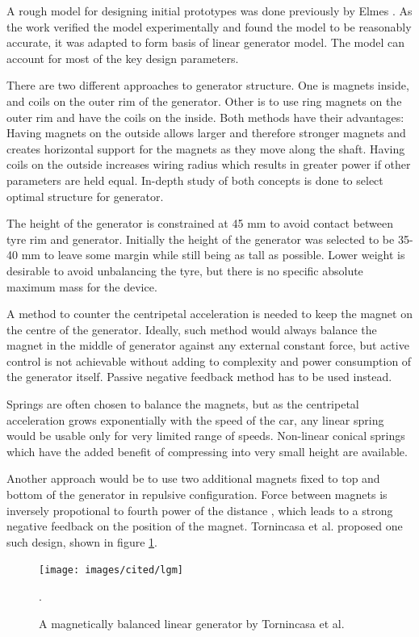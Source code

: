 A rough model for designing initial prototypes was done previously by Elmes \cite{Elmes2005}. As the work verified the model experimentally and found the model to be reasonably accurate, it was adapted to form basis of linear generator model. The model can account for most of the key design parameters. 

There are two different approaches to generator structure. One is magnets inside, and coils on the outer rim of the generator. Other is to use ring magnets on the outer rim and have the coils on the inside. Both methods have their advantages: Having magnets on the outside allows larger and therefore stronger magnets and creates horizontal support for the magnets as they move along the shaft. Having coils on the outside increases wiring radius which results in greater power if other parameters are held equal. In-depth study of both concepts is done to select optimal structure for generator. 

The height of the generator is constrained at 45 mm to avoid contact between tyre rim and generator. Initially the height of the generator was selected to be 35-40 mm to leave some margin while still being as tall as possible. Lower weight is desirable to avoid unbalancing the tyre, but there is no specific absolute maximum mass for the device. 

A method to counter the centripetal acceleration is needed to keep the magnet on the centre of the generator. Ideally, such method would always balance the magnet in the middle of generator against any external constant force, but active control is not achievable without adding to complexity and power consumption of the generator itself. Passive negative feedback method has to be used instead. 

Springs are often chosen to balance the magnets, but as the centripetal acceleration grows exponentially with the speed of the car, any linear spring would be usable only for very limited range of speeds. Non-linear conical springs which have the added benefit of compressing into very small height are available.

Another approach would be to use two additional magnets fixed to top and bottom of the generator in repulsive configuration. Force between magnets is inversely propotional to fourth power of the distance \cite{Amrani2015}, which leads to a strong negative feedback on the position of the magnet. Tornincasa et al. \cite{Tornincasa2012} proposed one such design, shown in figure \ref{lgm}.

\begin{figure}[htb]
\begin{center}
\texttt{[image: images/cited/lgm]}
\end{center}
\caption{A magnetically balanced linear generator by Tornincasa et al. \cite{Tornincasa2012}}.
\label{lgm}
\end{figure}

